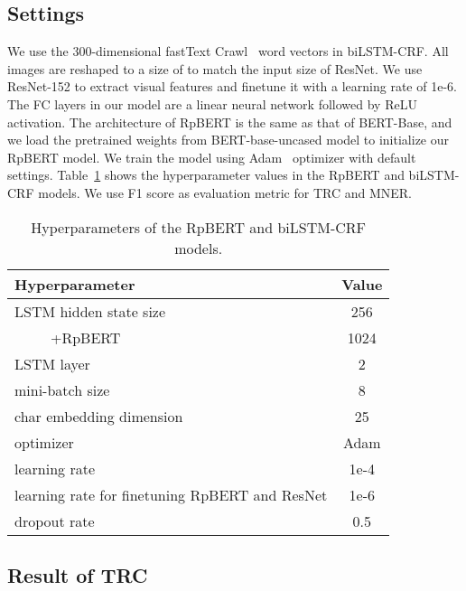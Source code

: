 \documentclass[letterpaper]{article} \usepackage{aaai21}  \usepackage{times}  \usepackage{helvet} \usepackage{courier}  \usepackage[hyphens]{url}  \usepackage{graphicx} \urlstyle{rm} \def\UrlFont{\rm}  \usepackage{natbib}  \usepackage{caption} \frenchspacing  \setlength{\pdfpagewidth}{8.5in}  \setlength{\pdfpageheight}{11in}
\begin{document}
\subsection{Settings}

We use the 300-dimensional fastText Crawl~\cite{mikolov2018advances} word vectors in biLSTM-CRF.
All images are reshaped to a size of  to match the input size of ResNet.
We use ResNet-152 to extract visual features and finetune it with a learning rate of 1e-6.
The FC layers in our model are a linear neural network followed by ReLU activation.
The architecture of  RpBERT is the same as  that of BERT-Base, and  we load the pretrained weights from BERT-base-uncased model  to initialize our RpBERT model.
We train the model using Adam~\cite{kingma2014adam} optimizer with default settings. 
Table~\ref{tab:parameters} shows the hyperparameter values in the RpBERT and biLSTM-CRF models.
We use F1 score as evaluation metric for TRC and MNER.








\begin{table}[htb]

\begin{center}
\small
\begin{tabular}{|l|c|}

\hline
Hyperparameter & Value\\
\hline
LSTM hidden state size  &256\\
~~~~~+RpBERT& 1024\\
LSTM layer  & 2\\
mini-batch size&8\\
char embedding dimension & 25\\
optimizer& Adam\\
learning rate & 1e-4\\  learning rate for finetuning RpBERT and ResNet& 1e-6\\  dropout rate  & 0.5\\
\hline
\end{tabular}
\end{center}
\caption{Hyperparameters of the RpBERT and biLSTM-CRF models.}\label{tab:parameters}
\end{table}




\subsection{Result of TRC}
\end{document}
